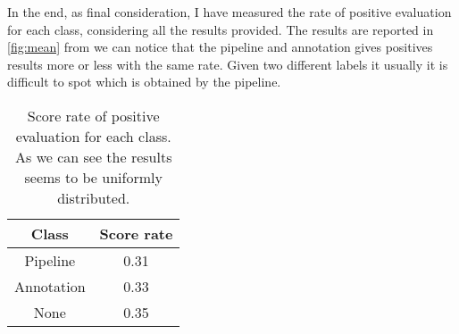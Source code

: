 \documentclass{standalone}
\begin{document}
	In the end, as final consideration, I have measured the rate of positive evaluation for each class, considering all the results provided.  The results are reported in \tablename\,\ref{fig:mean} from we can notice that the pipeline and annotation gives positives results more or less with the same rate. Given two different labels it usually it is difficult to spot which is obtained by the pipeline.
	
	\begin{table}[h!]
		\centering
		\begin{tabular}{|c|c|}
			\hline
			Class 		& Score rate \\ \hline
			Pipeline 	& 0.31		 \\ \hline
			Annotation  & 0.33		 \\ \hline
			None 		& 0.35		\\ \hline
		\end{tabular}
	\caption{Score rate of positive evaluation for each class. As we can see the results seems to be uniformly distributed.}
	\end{table}
	
\end{document}
